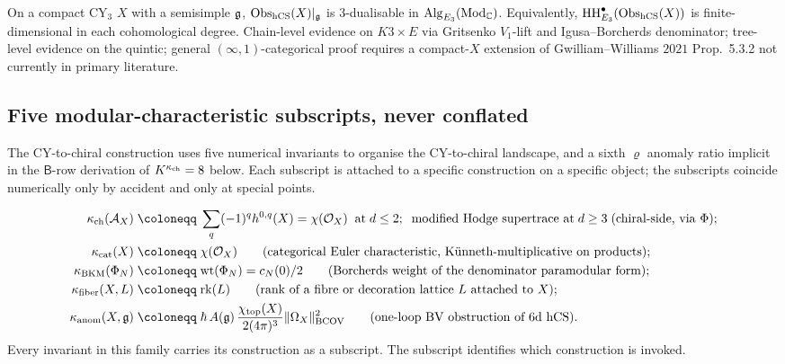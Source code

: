 \begin{conjecture}
\label{wn:conj:spine-compact-recovery}
On a compact CY$_3$ $X$ with a semisimple $\mathfrak{g}$,
$\mathrm{Obs}_{\mathrm{hCS}}(X)|_{\mathfrak{g}}$ is $3$-dualisable in
$\mathrm{Alg}_{E_3}(\mathrm{Mod}_{\mathbb{C}})$. Equivalently,
$\mathrm{HH}^{\bullet}_{E_3}(\mathrm{Obs}_{\mathrm{hCS}}(X))$ is finite-dimensional in
each cohomological degree. Chain-level evidence on $K3 \times E$ via
Gritsenko $V_1$-lift and Igusa--Borcherds denominator; tree-level
evidence on the quintic; general $(\infty,1)$-categorical proof
requires a compact-$X$ extension of Gwilliam--Williams $2021$
Prop.~5.3.2 not currently in primary literature.
\end{conjecture}

\subsection{Five modular-characteristic subscripts, never conflated}
\label{wn:subsec:spine-five-kappas}

The CY-to-chiral construction uses five numerical invariants to organise the
CY-to-chiral landscape, and a sixth $\varrho$ anomaly ratio implicit in
the $\mathsf{B}$-row derivation of $K^{\kappa_{\mathrm{ch}}} = 8$ below. Each
subscript is attached to a specific construction on a specific
object; the subscripts coincide numerically only by accident and only
at special points.

\begin{definition}
\label{wn:def:spine-kappas}
\begin{align*}
\kch(\cA_X) &\;\coloneqq\; \sum_q (-1)^q h^{0,q}(X)
= \chi(\cO_X)\;\;\text{at}\;d\leq 2;\;\;
\text{modified Hodge supertrace at}\;d \geq 3
\;\text{(chiral-side, via }\Phi\text{)};\\
\kcat(X) &\;\coloneqq\; \chi(\cO_X)
\qquad\text{(categorical Euler characteristic, K\"unneth-multiplicative
on products)};\\
\kBKM(\Phi_N) &\;\coloneqq\; \mathrm{wt}(\Phi_N) = c_N(0)/2
\qquad\text{(Borcherds weight of the denominator paramodular form)};\\
\kfib(X, L) &\;\coloneqq\; \mathrm{rk}(L)
\qquad\text{(rank of a fibre or decoration lattice $L$ attached to $X$)};\\
\kanom(X, \fg) &\;\coloneqq\;
\hbar\, A(\fg)\, \frac{\chi_{\mathrm{top}}(X)}{2(4\pi)^3}
\|\Omega_X\|^2_{\mathrm{BCOV}}
\qquad\text{(one-loop BV obstruction of $6$d $\hCS$)}.
\end{align*}
Every invariant in this family carries its construction as a subscript.
The subscript identifies which construction is invoked.
\end{definition}

